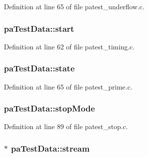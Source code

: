Definition at line 65 of file patest\+\_\+underflow.\+c.

\subsubsection[{\texorpdfstring{start}{start}}]{ pa\+Test\+Data\+::start}\hypertarget{structpa_test_data_a7a36671af78b30ae492e39793ed33cc9}{}\label{structpa_test_data_a7a36671af78b30ae492e39793ed33cc9}


Definition at line 62 of file patest\+\_\+timing.\+c.

\subsubsection[{\texorpdfstring{state}{state}}]{ pa\+Test\+Data\+::state}\hypertarget{structpa_test_data_a5221f25e1bd2fa7a57da76ceb805e1a4}{}\label{structpa_test_data_a5221f25e1bd2fa7a57da76ceb805e1a4}


Definition at line 65 of file patest\+\_\+prime.\+c.

\subsubsection[{\texorpdfstring{stop\+Mode}{stopMode}}]{ pa\+Test\+Data\+::stop\+Mode}\hypertarget{structpa_test_data_a1b39e57f12a470c571dfe6b189351538}{}\label{structpa_test_data_a1b39e57f12a470c571dfe6b189351538}


Definition at line 89 of file patest\+\_\+stop.\+c.

\subsubsection[{\texorpdfstring{stream}{stream}}]{$\ast$ pa\+Test\+Data\+::stream}\hypertarget{structpa_test_data_abe84973552ec4e09743bb708b3730366}{}\label{structpa_test_data_abe84973552ec4e09743bb708b3730366}


